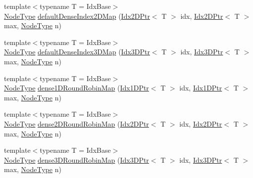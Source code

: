 \begin{DoxyCompactItemize}
\item 
{\footnotesize template$<$typename T  = Idx\+Base$>$ }\\\hyperlink{namespacevt_a866da9d0efc19c0a1ce79e9e492f47e2}{Node\+Type} \hyperlink{namespacevt_1_1mapping_a011c4e2cb832d3edcd98e3803d405ad4}{default\+Dense\+Index2\+D\+Map} (\hyperlink{namespacevt_1_1mapping_a6832cbb1361fe72fd7ec730e7b7773b3}{Idx2\+D\+Ptr}$<$ T $>$ idx, \hyperlink{namespacevt_1_1mapping_a6832cbb1361fe72fd7ec730e7b7773b3}{Idx2\+D\+Ptr}$<$ T $>$ max, \hyperlink{namespacevt_a866da9d0efc19c0a1ce79e9e492f47e2}{Node\+Type} n)
\item 
{\footnotesize template$<$typename T  = Idx\+Base$>$ }\\\hyperlink{namespacevt_a866da9d0efc19c0a1ce79e9e492f47e2}{Node\+Type} \hyperlink{namespacevt_1_1mapping_a776a69138a1fbceab5bbf10b9c07a858}{default\+Dense\+Index3\+D\+Map} (\hyperlink{namespacevt_1_1mapping_aacc737158b6517f2d760ffc8d1b5abca}{Idx3\+D\+Ptr}$<$ T $>$ idx, \hyperlink{namespacevt_1_1mapping_aacc737158b6517f2d760ffc8d1b5abca}{Idx3\+D\+Ptr}$<$ T $>$ max, \hyperlink{namespacevt_a866da9d0efc19c0a1ce79e9e492f47e2}{Node\+Type} n)
\item 
{\footnotesize template$<$typename T  = Idx\+Base$>$ }\\\hyperlink{namespacevt_a866da9d0efc19c0a1ce79e9e492f47e2}{Node\+Type} \hyperlink{namespacevt_1_1mapping_a2a4e62c5dc17da0032d3953c7e3cde8b}{dense1\+D\+Round\+Robin\+Map} (\hyperlink{namespacevt_1_1mapping_a8b576cf2f31069778e4951f64bccafd8}{Idx1\+D\+Ptr}$<$ T $>$ idx, \hyperlink{namespacevt_1_1mapping_a8b576cf2f31069778e4951f64bccafd8}{Idx1\+D\+Ptr}$<$ T $>$ max, \hyperlink{namespacevt_a866da9d0efc19c0a1ce79e9e492f47e2}{Node\+Type} n)
\item 
{\footnotesize template$<$typename T  = Idx\+Base$>$ }\\\hyperlink{namespacevt_a866da9d0efc19c0a1ce79e9e492f47e2}{Node\+Type} \hyperlink{namespacevt_1_1mapping_ac606a5886c93a4dbb05dfead285c30c6}{dense2\+D\+Round\+Robin\+Map} (\hyperlink{namespacevt_1_1mapping_a6832cbb1361fe72fd7ec730e7b7773b3}{Idx2\+D\+Ptr}$<$ T $>$ idx, \hyperlink{namespacevt_1_1mapping_a6832cbb1361fe72fd7ec730e7b7773b3}{Idx2\+D\+Ptr}$<$ T $>$ max, \hyperlink{namespacevt_a866da9d0efc19c0a1ce79e9e492f47e2}{Node\+Type} n)
\item 
{\footnotesize template$<$typename T  = Idx\+Base$>$ }\\\hyperlink{namespacevt_a866da9d0efc19c0a1ce79e9e492f47e2}{Node\+Type} \hyperlink{namespacevt_1_1mapping_aa48fa3b830b637787c584dbac5bba6db}{dense3\+D\+Round\+Robin\+Map} (\hyperlink{namespacevt_1_1mapping_aacc737158b6517f2d760ffc8d1b5abca}{Idx3\+D\+Ptr}$<$ T $>$ idx, \hyperlink{namespacevt_1_1mapping_aacc737158b6517f2d760ffc8d1b5abca}{Idx3\+D\+Ptr}$<$ T $>$ max, \hyperlink{namespacevt_a866da9d0efc19c0a1ce79e9e492f47e2}{Node\+Type} n)

\end{DoxyCompactItemize}
